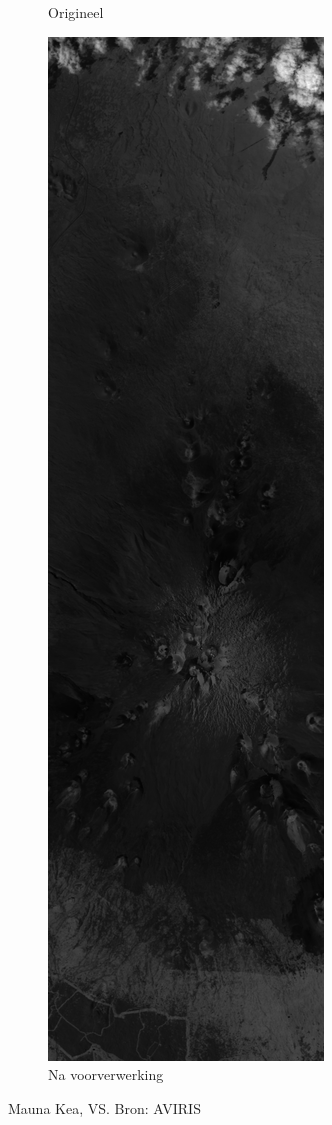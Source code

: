 \begin{figure}[H]
\begin{subfigure}{.5\textwidth}
  \caption{Origineel}
\end{subfigure}%
\begin{subfigure}{.5\textwidth}
  \centering
  \includegraphics[scale=0.14]{images/mauna_kea_sum.png}
  \caption{Na voorverwerking}
\end{subfigure}
\caption{Mauna Kea, VS. Bron: AVIRIS \cite{ref:aviris}}
\label{fig:mauna_kea}
\end{figure}

